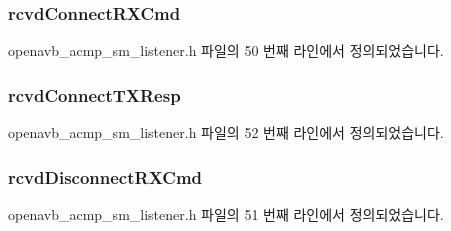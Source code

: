 \subsubsection[{\texorpdfstring{rcvd\+Connect\+R\+X\+Cmd}{rcvdConnectRXCmd}}]{ rcvd\+Connect\+R\+X\+Cmd}\hypertarget{structopenavb__acmp__sm__listener__vars__t_af9d28606e8d8a675efcd7519ada1a356}{}\label{structopenavb__acmp__sm__listener__vars__t_af9d28606e8d8a675efcd7519ada1a356}


openavb\+\_\+acmp\+\_\+sm\+\_\+listener.\+h 파일의 50 번째 라인에서 정의되었습니다.

\subsubsection[{\texorpdfstring{rcvd\+Connect\+T\+X\+Resp}{rcvdConnectTXResp}}]{ rcvd\+Connect\+T\+X\+Resp}\hypertarget{structopenavb__acmp__sm__listener__vars__t_a7b91d3f570065af695eb6383a5674913}{}\label{structopenavb__acmp__sm__listener__vars__t_a7b91d3f570065af695eb6383a5674913}


openavb\+\_\+acmp\+\_\+sm\+\_\+listener.\+h 파일의 52 번째 라인에서 정의되었습니다.

\subsubsection[{\texorpdfstring{rcvd\+Disconnect\+R\+X\+Cmd}{rcvdDisconnectRXCmd}}]{ rcvd\+Disconnect\+R\+X\+Cmd}\hypertarget{structopenavb__acmp__sm__listener__vars__t_a6e45c0c8c9f8e23414d448e4c1432670}{}\label{structopenavb__acmp__sm__listener__vars__t_a6e45c0c8c9f8e23414d448e4c1432670}


openavb\+\_\+acmp\+\_\+sm\+\_\+listener.\+h 파일의 51 번째 라인에서 정의되었습니다.

